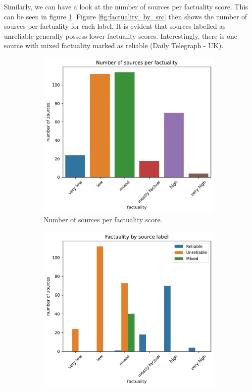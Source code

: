 Similarly, we can have a look at the number of sources per factuality score. This can be seen in figure \ref{fig:factuality_dist}. Figure \ref{fig:factuality_by_src} then shows the number of sources per factuality for each label. It is evident that sources labelled as unreliable generally possess lower factuality scores. Interestingly, there is one source with mixed factuality marked as reliable (Daily Telegraph - UK). 

\begin{figure}[H]
    \centering
    \begin{subfigure}{.5\textwidth}
      \centering
      \includegraphics[width=\linewidth]{obrazky-figures/factuality_dist.pdf}
      \caption{Number of sources per factuality score.}
      \label{fig:factuality_dist}
    \end{subfigure}%
    \begin{subfigure}{.5\textwidth}
      \centering
      \includegraphics[width=\linewidth]{obrazky-figures/factuality_by_src.pdf}

\end{subfigure}
\end{figure}
